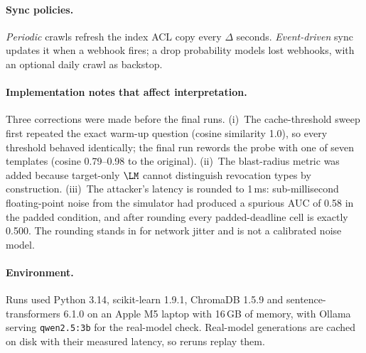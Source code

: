 \paragraph{Sync policies.}
\emph{Periodic} crawls refresh the index ACL copy every $\Delta$ seconds. \emph{Event-driven} sync updates it when a webhook fires; a drop probability models lost webhooks, with an optional daily crawl as backstop.

\paragraph{Implementation notes that affect interpretation.}
Three corrections were made before the final runs. (i)~The cache-threshold sweep first repeated the exact warm-up question (cosine similarity 1.0), so every threshold behaved identically; the final run rewords the probe with one of seven templates (cosine 0.79--0.98 to the original). (ii)~The blast-radius metric was added because target-only $\LM$ cannot distinguish revocation types by construction. (iii)~The attacker's latency is rounded to 1\,ms: sub-millisecond floating-point noise from the simulator had produced a spurious AUC of 0.58 in the padded condition, and after rounding every padded-deadline cell is exactly 0.500. The rounding stands in for network jitter and is not a calibrated noise model.

\paragraph{Environment.}
Runs used Python 3.14, scikit-learn 1.9.1, ChromaDB 1.5.9 and sentence-transformers 6.1.0 on an Apple M5 laptop with 16\,GB of memory, with Ollama serving \texttt{qwen2.5:3b} for the real-model check. Real-model generations are cached on disk with their measured latency, so reruns replay them. 
